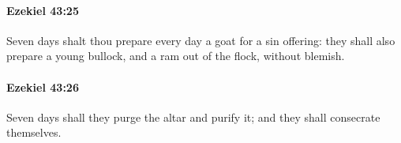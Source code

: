 		\paragraph{Ezekiel 43:25} %
			\label{EZEKIEL-43-25}

			Seven days shalt thou prepare every day a goat for a sin offering: they shall also prepare a young bullock, and a ram out of the flock, without blemish.


		\paragraph{Ezekiel 43:26} %
			\label{EZEKIEL-43-26}

			Seven days shall they purge the altar and purify it; and they shall consecrate themselves.


